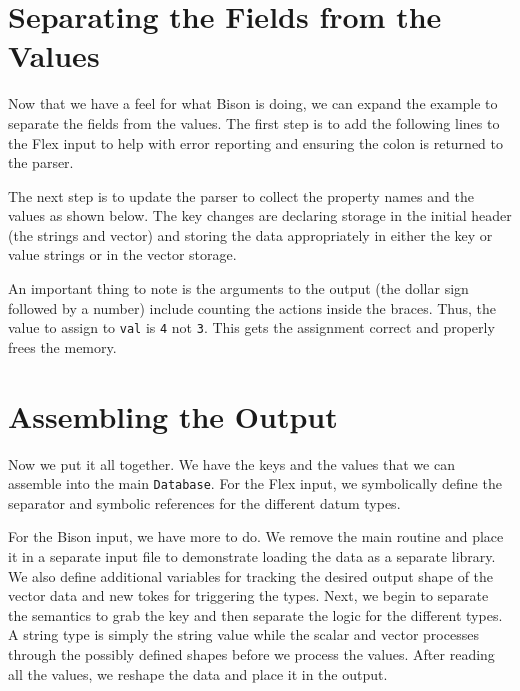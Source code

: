 \documentclass{article}
\begin{document}
\begin{code block}
    
\end{code block}

\section{Separating the Fields from the Values}

Now that we have a feel for what Bison is doing, we can expand the
example to separate the fields from the values.  The first step is to
add the following lines to the Flex input to help with error reporting
and ensuring the colon is returned to the parser.

\begin{code block}
    
\end{code block}

The next step is to update the parser to collect the property names and
the values as shown below.  The key changes are declaring storage in the
initial header (the strings and vector) and storing the data
appropriately in either the key or value strings or in the vector
storage.

\begin{code block}
    
\end{code block}

An important thing to note is the arguments to the output (the dollar
sign followed by a number) include counting the actions inside the
braces.  Thus, the value to assign to \lstinline{val} is \lstinline{4}
not \lstinline{3}.  This gets the assignment correct and properly frees
the memory.

\section{Assembling the Output}

Now we put it all together.  We have the keys and the values that we can
assemble into the main \lstinline{Database}.  For the Flex input, we
symbolically define the separator and symbolic references for the
different datum types.

\begin{code block}
    
\end{code block}

For the Bison input, we have more to do.  We remove the main routine and
place it in a separate input file to demonstrate loading the data as a
separate library.  We also define additional variables for tracking the
desired output shape of the vector data and new tokes for triggering the
types.  Next, we begin to separate the semantics to grab the key and
then separate the logic for the different types.  A string type is
simply the string value while the scalar and vector processes through
the possibly defined shapes before we process the values.  After reading
all the values, we reshape the data and place it in the output.
\end{document}
